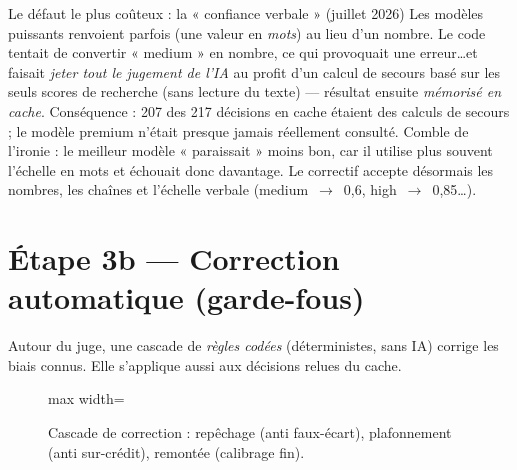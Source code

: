 \documentclass[11pt,a4paper]{report}
\newcommand{\code}[1]{\texttt{\detokenize{#1}}}
\newcommand{\stage}[1]{\textcolor{royal}{\textbf{#1}}}
\newenvironment{fitpic}{\begin{center}\begin{adjustbox}{max width=\linewidth}}{\end{adjustbox}\end{center}}
\begin{document}
\begin{keybox}{Le défaut le plus coûteux : la « confiance verbale » (juillet 2026)}
Les modèles puissants renvoient parfois \code{"confidence": "medium"} (une valeur en \emph{mots}) au lieu d'un nombre. Le code tentait de convertir « medium » en nombre, ce qui provoquait une erreur\ldots et faisait \emph{jeter tout le jugement de l'IA} au profit d'un calcul de secours basé sur les seuls scores de recherche (sans lecture du texte) --- résultat ensuite \emph{mémorisé en cache}. Conséquence : 207 des 217 décisions en cache étaient des calculs de secours ; le modèle premium n'était presque jamais réellement consulté. Comble de l'ironie : le meilleur modèle « paraissait » moins bon, car il utilise plus souvent l'échelle en mots et échouait donc davantage. Le correctif accepte désormais les nombres, les chaînes et l'échelle verbale (medium~$\rightarrow$~0,6, high~$\rightarrow$~0,85\ldots).
\end{keybox}

\chapter{Étape 3b --- Correction automatique (garde-fous)}

Autour du juge, une cascade de \emph{règles codées} (déterministes, sans IA) corrige les biais connus. Elle s'applique aussi aux décisions relues du cache.

\begin{figure}[h]
\begin{fitpic}
\end{fitpic}
\caption{Cascade de correction : repêchage (anti faux-écart), plafonnement (anti sur-crédit), remontée (calibrage fin).}
\end{figure}
\end{document}
